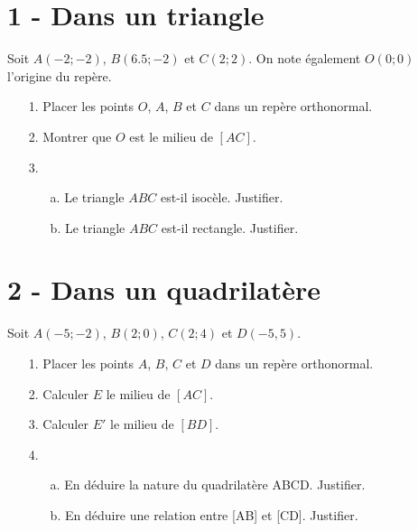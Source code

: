 \documentclass[11pt]{article}
\begin{document}
\begin{multicols}{2}
\section*{1 - Dans un triangle}

Soit $A(-2;-2)$, $B(6.5;-2)$ et $C(2;2)$. On note également $O(0;0)$ l'origine du repère.

\begin{enumerate}

\item[1.] Placer les points $O$, $A$, $B$ et $C$ dans un repère orthonormal.
\item[2.] Montrer que $O$ est le milieu de $[AC]$.
\item[3.] 
	\begin{enumerate}
	\item[a.] Le triangle $ABC$ est-il isocèle. Justifier.
	\item[b.] Le triangle $ABC$ est-il rectangle. Justifier.
	\end{enumerate}

\end{enumerate}


\section*{2 - Dans un quadrilatère}

Soit $A(-5;-2)$, $B(2;0)$, $C(2;4)$ et $D(-5,5)$. 

\begin{enumerate}

\item[1.] Placer les points $A$, $B$, $C$ et $D$ dans un repère orthonormal.
\item[2.] Calculer $E$ le milieu de $[AC]$.
\item[3.] Calculer $E'$ le milieu de $[BD]$.
\item[4.] 
	\begin{enumerate}
	\item[a.] En déduire la nature du quadrilatère ABCD. Justifier.
	\item[b.] En déduire une relation entre [AB] et [CD]. Justifier.
	\end{enumerate}
\end{enumerate}
\end{multicols}
\end{document}
